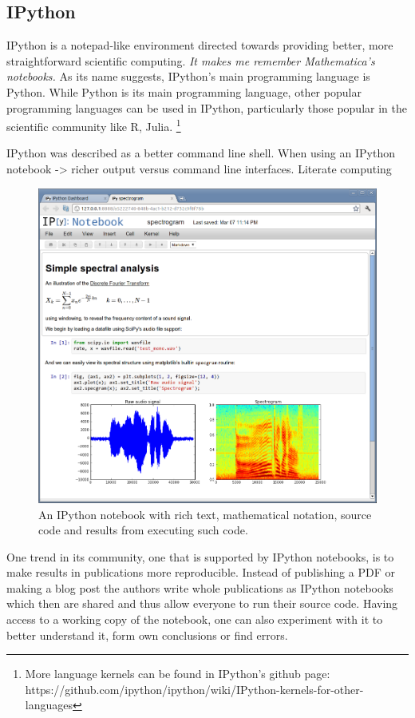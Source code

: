 \documentclass{./llncs2e/llncs}
\begin{document}
\subsection{IPython\cite{PER-GRA:2007}}
	IPython is a notepad-like environment directed towards providing better, more straightforward scientific computing. \emph{It makes me remember Mathematica's notebooks.} As its name suggests, IPython's main programming language is Python. 
	While Python is its main programming language, other popular programming languages can be used in IPython, particularly those popular in the scientific community like R, Julia. \footnote{More language kernels can be found in IPython's github page: https://github.com/ipython/ipython/wiki/IPython-kernels-for-other-languages}

	IPython was described as a better command line shell.
	When using an IPython notebook -> richer output versus command line interfaces.
	Literate computing

	\begin{figure}
		\centering
		\includegraphics[width=1.0\textwidth]{img/ipython_notebook}
			\caption{An IPython notebook with rich text, mathematical notation, source code and results from executing such code.}
		\label{fig:ipython:notebook}
	\end{figure}

	One trend in its community, one that is supported by IPython notebooks, is to make results in publications more reproducible. 
	Instead of publishing a PDF or making a blog post the authors write whole publications as IPython notebooks which then are shared and thus allow everyone to run their source code. 
	Having access to a working copy of the notebook, one can also experiment with it to better understand it, form own conclusions or find errors.
\end{document}
